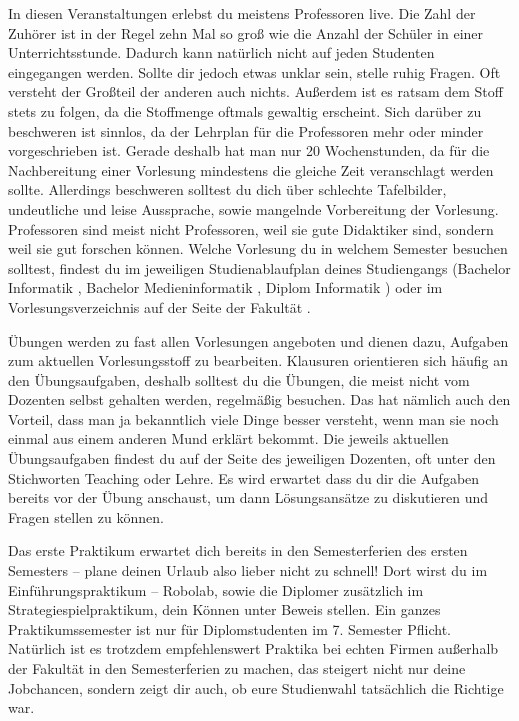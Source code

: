 In diesen Veranstaltungen erlebst du meistens Professoren live.
Die Zahl der Zuhörer ist in der Regel zehn Mal so groß wie die Anzahl der Schüler in einer Unterrichtsstunde. Dadurch kann natürlich nicht auf jeden Studenten eingegangen werden. Sollte dir jedoch etwas unklar sein, stelle ruhig Fragen. Oft versteht der Großteil der anderen auch nichts.
Außerdem ist es ratsam dem Stoff stets zu folgen, da die Stoffmenge oftmals gewaltig erscheint. Sich darüber zu beschweren ist sinnlos, da der Lehrplan für die Professoren mehr oder minder vorgeschrieben ist.
Gerade deshalb hat man nur 20 Wochenstunden, da für die Nachbereitung einer Vorlesung mindestens die gleiche Zeit veranschlagt werden sollte.
Allerdings beschweren solltest du dich über schlechte Tafelbilder, undeutliche und leise Aussprache, sowie mangelnde Vorbereitung der Vorlesung. 
Professoren sind meist nicht Professoren, weil sie gute Didaktiker sind, sondern weil sie gut forschen können.
Welche Vorlesung du in welchem Semester besuchen solltest, findest du im jeweiligen Studienablaufplan deines Studiengangs (Bachelor Informatik , Bachelor Medieninformatik , Diplom Informatik ) oder im Vorlesungsverzeichnis auf der Seite der Fakultät .



Übungen werden zu fast allen Vorlesungen angeboten und dienen dazu, Aufgaben zum aktuellen Vorlesungsstoff zu bearbeiten. Klausuren orientieren sich häufig an den Übungsaufgaben, deshalb solltest du die Übungen, die meist nicht vom Dozenten selbst gehalten werden, regelmäßig besuchen.
Das hat nämlich auch den Vorteil, dass man ja bekanntlich viele Dinge besser versteht, wenn man sie noch einmal aus einem anderen Mund erklärt bekommt.
Die jeweils aktuellen Übungsaufgaben findest du auf der Seite des jeweiligen Dozenten, oft unter den Stichworten Teaching oder Lehre.
Es wird erwartet dass du dir die Aufgaben bereits vor der Übung anschaust, um dann Lösungsansätze zu diskutieren und Fragen stellen zu können.



Das erste Praktikum erwartet dich bereits in den Semesterferien des ersten Semesters – plane deinen Urlaub also lieber nicht zu schnell!
Dort wirst du im Einführungspraktikum – Robolab, sowie die Diplomer zusätzlich im Strategiespielpraktikum, dein Können unter Beweis stellen.
Ein ganzes Praktikumssemester ist nur für Diplomstudenten im 7. Semester Pflicht.
Natürlich ist es trotzdem empfehlenswert Praktika bei echten Firmen außerhalb der Fakultät in den Semesterferien zu machen, das steigert nicht nur deine Jobchancen, sondern zeigt dir auch, ob eure Studienwahl tatsächlich die Richtige war.


